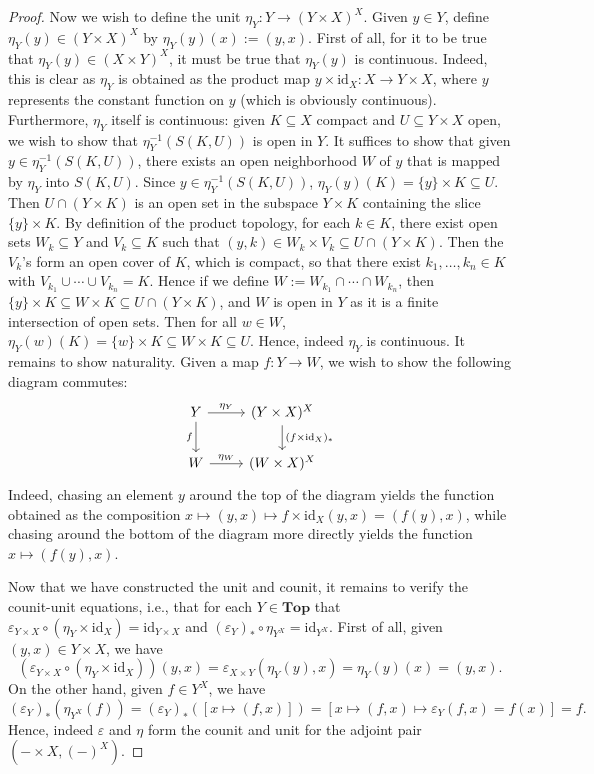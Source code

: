 \documentclass{amsart}
\theoremstyle{plain}
\theoremstyle{definition}
\newcommand{\Top}{\mbf{Top}}
\newcommand{\sseq}{\subseteq}
\newcommand{\0}{\mathbf{0}}
\newcommand{\id}{\mathrm{id}}
\newcommand{\mbf}[1]{\mathbf{#1}}
\newcommand{\vare}{\varepsilon}
\renewcommand{\(}{\left(}
\renewcommand{\)}{\right)}
\begin{document}
\begin{proof}
  Now we wish to define the unit $\eta_Y:Y\to(Y\times X)^X$. Given $y\in Y$, define $\eta_Y(y)\in (Y\times X)^X$ by $\eta_Y(y)(x):=(y,x)$. First of all, for it to be true that $\eta_Y(y)\in(X\times Y)^X$, it must be true that $\eta_Y(y)$ is continuous. Indeed, this is clear as $\eta_Y$ is obtained as the product map $y\times\id_X:X\to Y\times X$, where $y$ represents the constant function on $y$ (which is obviously continuous). Furthermore, $\eta_Y$ itself is continuous: given $K\sseq X$ compact and $U\sseq Y\times X$ open, we wish to show that $\eta_Y^{-1}(S(K,U))$ is open in $Y$. It suffices to show that given $y\in\eta_Y^{-1}(S(K,U))$, there exists an open neighborhood $W$ of $y$ that is mapped by $\eta_Y$ into $S(K,U)$. Since $y\in\eta_Y^{-1}(S(K,U))$, $\eta_Y(y)(K)=\{y\}\times K\sseq U$. Then $U\cap (Y\times K)$ is an open set in the subspace $Y\times K$ containing the slice $\{y\}\times K$. By definition of the product topology, for each $k\in K$, there exist open sets $W_k\sseq Y$ and $V_k\sseq K$ such that $(y,k)\in W_k\times V_k\sseq U\cap(Y\times K)$. Then the $V_k$'s form an open cover of $K$, which is compact, so that there exist $k_1,\ldots,k_n\in K$ with $V_{k_1}\cup\cdots\cup V_{k_n}=K$. Hence if we define $W:=W_{k_1}\cap\cdots\cap W_{k_n}$, then $\{y\}\times K\sseq W\times K\sseq U\cap(Y\times K)$, and $W$ is open in $Y$ as it is a finite intersection of open sets. Then for all $w\in W$, $\eta_Y(w)(K)=\{w\}\times K\sseq W\times K\sseq U$. Hence, indeed $\eta_Y$ is continuous. It remains to show naturality. Given a map $f:Y\to W$, we wish to show the following diagram commutes:
  \[\begin{tikzcd}
    Y & {(Y\times  X)^X} \\
    W & {(W\times X)^X}
    \arrow["f"', from=1-1, to=2-1]
    \arrow["{\eta_W}", from=2-1, to=2-2]
    \arrow["{\eta_Y}", from=1-1, to=1-2]
    \arrow["{(f\times\id_X)_*}", from=1-2, to=2-2]
  \end{tikzcd}\]
  Indeed, chasing an element $y$ around the top of the diagram yields the function obtained as the composition $x\mapsto (y,x)\mapsto f\times\id_X(y,x)=(f(y),x)$, while chasing around the bottom of the diagram more directly yields the function $x\mapsto (f(y),x)$.


  Now that we have constructed the unit and counit, it remains to verify the counit-unit equations, i.e., that for each $Y\in\Top$ that $\vare_{Y\times X}\circ(\eta_Y\times\id_X)=\id_{Y\times X}$ and $(\vare_Y)_*\circ\eta_{Y^X}=\id_{Y^X}$. First of all, given $(y,x)\in Y\times X$, we have
  \[(\vare_{Y\times X}\circ (\eta_Y\times\id_X))(y,x)=\vare_{X\times Y}(\eta_Y(y),x)=\eta_Y(y)(x)=(y,x).\]
  On the other hand, given $f\in Y^X$, we have
  \[(\vare_Y)_*(\eta_{Y^X}(f))=(\vare_Y)_*([x\mapsto (f,x)])=[x\mapsto (f,x)\mapsto\vare_Y(f,x)=f(x)]=f.\]
  Hence, indeed $\vare$ and $\eta$ form the counit and unit for the adjoint pair $(-\times X,(-)^X)$.
\end{proof}
\end{document}
